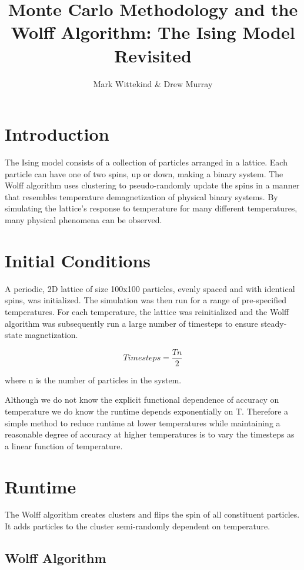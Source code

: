 \documentclass[10pt]{article}
\title{Monte Carlo Methodology and the Wolff Algorithm: \newline The Ising Model Revisited}
\author{Mark Wittekind \& Drew Murray}
\newcommand{\beq}{\begin{equation}}
\newcommand{\eeq}{\end{equation}}
\begin{document}
\maketitle
\section{Introduction}

The Ising model consists of a collection of particles arranged in a lattice.  Each particle can have one of two spins, up or down, making a binary system.  The Wolff algorithm uses clustering to pseudo-randomly update the spins in a manner that resembles temperature demagnetization of physical binary systems.  By simulating the lattice's response to temperature for many different temperatures, many physical phenomena can be observed.


\section{Initial Conditions}

A periodic, 2D lattice of size 100x100 particles, evenly spaced and with identical spins, was initialized.  The simulation was then run for a range of pre-specified temperatures.  For each temperature, the lattice was reinitialized and the Wolff algorithm was subsequently run a large number of timesteps to ensure steady-state magnetization.

\beq
\label{eqn:equation1}
Timesteps = \frac{Tn}{2}
\eeq

where n is the number of particles in the system.

Although we do not know the explicit functional dependence of accuracy on temperature we do know the runtime depends exponentially on T.  Therefore a simple method to reduce runtime at lower temperatures while maintaining a reasonable degree of accuracy at higher temperatures is to vary the timesteps as a linear function of temperature.

\section{Runtime}

The Wolff algorithm creates clusters and flips the spin of all constituent particles.  It adds particles to the cluster semi-randomly dependent on temperature.

\subsection{Wolff Algorithm}
\end{document}
